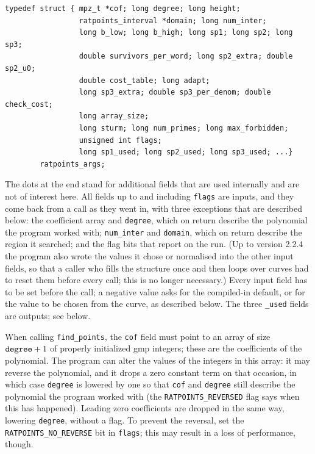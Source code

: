 \documentclass[12pt,a4paper,oneside]{amsart}
\begin{document}
\begin{verbatim}
typedef struct { mpz_t *cof; long degree; long height;
                 ratpoints_interval *domain; long num_inter;
                 long b_low; long b_high; long sp1; long sp2; long sp3;
                 double survivors_per_word; long sp2_extra; double sp2_u0;
                 double cost_table; long adapt;
                 long sp3_extra; double sp3_per_denom; double check_cost;
                 long array_size;
                 long sturm; long num_primes; long max_forbidden;
                 unsigned int flags;
                 long sp1_used; long sp2_used; long sp3_used; ...}
        ratpoints_args;
\end{verbatim}

The dots at the end stand for additional fields that are used internally
and are not of interest here. All fields up to and including \texttt{flags}
are inputs, and they come back from a call as they went in, with three
exceptions that are described below: the coefficient array and
\texttt{degree}, which on return describe the polynomial the program
worked with; \texttt{num\_inter} and \texttt{domain}, which on return
describe the region it searched; and the flag bits that report on the
run. (Up to version 2.2.4 the program also wrote the values it chose or
normalised into the other input fields, so that a caller who fills the
structure once and then loops over curves had to reset them before every
call; this is no longer necessary.) Every input field has to be set before
the call; a negative value asks for the compiled-in default, or for the
value to be chosen from the curve, as described below.
The three \texttt{\_used} fields are outputs; see below.

When calling \texttt{find\_points}, the
\texttt{cof} field must point to an array of size $\text{\texttt{degree}} + 1$
of properly initialized gmp integers; these are the coefficients of
the polynomial. The program can alter the values of the integers in this
array: it may reverse the polynomial, and it drops a zero constant term
on that occasion, in which case \texttt{degree} is lowered by one so that
\texttt{cof} and \texttt{degree} still describe the polynomial the program
worked with (the \texttt{RATPOINTS\_REVERSED} flag says when this has
happened). Leading zero coefficients are dropped in the same way, lowering
\texttt{degree}, without a flag.
To prevent the reversal, set the \texttt{RATPOINTS\_NO\_REVERSE} bit
in \texttt{flags}; this may result in a loss of performance, though.
\end{document}
